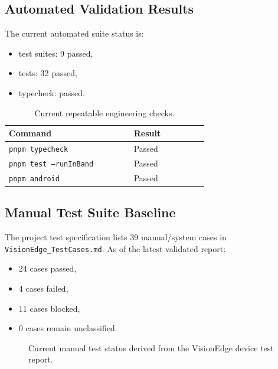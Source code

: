 \documentclass[conference]{IEEEtran}
\begin{document}
\subsection{Automated Validation Results}
The current automated suite status is:
\begin{itemize}[leftmargin=1.2em]
\item test suites: 9 passed,
\item tests: 32 passed,
\item typecheck: passed.
\end{itemize}

\begin{table}[!t]
\centering
\begin{tabular}{p{0.42\linewidth} p{0.25\linewidth}}
\toprule
Command & Result \\
\midrule
\texttt{pnpm typecheck} & Passed \\
\texttt{pnpm test --runInBand} & Passed \\
\texttt{pnpm android} & Passed \\
\bottomrule
\end{tabular}
\caption{Current repeatable engineering checks.}
\label{tab:engchecks}
\end{table}

\subsection{Manual Test Suite Baseline}
The project test specification lists 39 manual/system cases in \texttt{VisionEdge\_TestCases.md}. As of the latest validated report:
\begin{itemize}[leftmargin=1.2em]
\item 24 cases passed,
\item 4 cases failed,
\item 11 cases blocked,
\item 0 cases remain unclassified.
\end{itemize}

\begin{figure}[!t]
\centering
{}
\caption{Current manual test status derived from the VisionEdge device test report.}
\label{fig:teststatus}
\end{figure}
\end{document}
